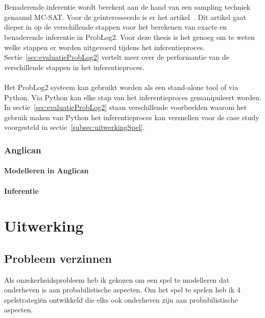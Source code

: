 \documentclass[12pt,a4paper,oneside]{book}
\theoremstyle{definition}
\begin{document}
\\\\
Benaderende inferentie wordt berekent aan de hand van een sampling techniek genaamd MC-SAT. Voor de ge\"{i}nteresseerde is er het artikel~\cite{plpinferencelearningwbf}. Dit artikel gaat dieper in op de verschillende stappen voor het berekenen van exacte en benaderende inferentie in ProbLog2. Voor deze thesis is het genoeg om te weten welke stappen er worden uitgevoerd tijdens het inferentieproces. Sectie~\ref{sec:evaluatieProbLog2} vertelt meer over de performantie van de verschillende stappen in het inferentieproces.
\\\\
Het ProbLog2 systeem kan gebruikt worden als een stand-alone tool of via Python. Via Python kan elke stap van het inferentieproces gemanipuleert worden. In sectie~\ref{sec:evaluatieProbLog2} staan verschillende voorbeelden waarom het gebruik maken van Python het inferentieproces kan versnellen voor de case study voorgesteld in sectie~\ref{subsec:uitwerkingSpel}.
\subsection{Anglican}
\label{sec:Anglican}
\subsubsection{Modelleren in Anglican}
\label{subsubsec:ModellerenInAnglican}
\subsubsection{Inferentie}
\label{subsubsec:InferentieAnglican}


\chapter{Uitwerking}
\section{Probleem verzinnen}
\label{sec:uitwerkingProblem}
Als onzekerheidsprobleem heb ik gekozen om een spel te modelleren dat onderheven is aan probabilistische aspecten. Om het spel te spelen heb ik 4 spelstrategiën ontwikkeld die elks ook onderheven zijn aan probabilistische aspecten.
\end{document}
